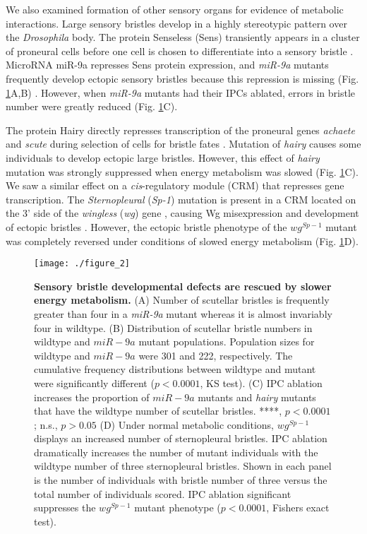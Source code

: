 We also examined formation of other sensory organs for evidence of metabolic interactions. Large sensory bristles develop in a highly stereotypic pattern over the \textit{Drosophila} body. The protein Senseless (Sens) transiently appears in a cluster of proneural cells before one cell is chosen to differentiate into a sensory bristle \cite{JafarNejad2003}. MicroRNA miR-9a represses Sens protein expression, and \textit{miR-9a} mutants frequently develop ectopic sensory bristles because this repression is missing (Fig. \ref{fig:metabolism:fig2}A,B) \cite{Cassidy2013,Li2006}. However, when \textit{miR-9a} mutants had their IPCs ablated, errors in bristle number were greatly reduced (Fig. \ref{fig:metabolism:fig2}C).

The protein Hairy directly represses transcription of the proneural genes \textit{achaete} and \textit{scute} during selection of cells for bristle fates \cite{VanDoren1994}. Mutation of \textit{hairy} causes some individuals to develop ectopic large bristles. However, this effect of \textit{hairy} mutation was strongly suppressed when energy metabolism was slowed (Fig. \ref{fig:metabolism:fig2}C). We saw a similar effect on a \textit{cis}-regulatory module (CRM) that represses gene transcription. The \textit{Sternopleural} (\textit{Sp-1}) mutation is present in a CRM located on the 3' side of the \textit{wingless} (\textit{wg}) gene \cite{Neumann1996a}, causing Wg misexpression and development of ectopic bristles \cite{Neumann1996a}. However, the ectopic bristle phenotype of the $wg^{Sp-1}$ mutant was completely reversed under conditions of slowed energy metabolism (Fig. \ref{fig:metabolism:fig2}D).

\begin{figure}[h!]
\centering
\texttt{[image: ./figure\_2]}
\caption[Sensory bristle developmental defects are rescued by slower energy metabolism.]{\textbf{Sensory bristle developmental defects are rescued by slower energy metabolism.} (A) Number of scutellar bristles is frequently greater than four in a \textit{miR-9a} mutant whereas it is almost invariably four in wildtype. (B) Distribution of scutellar bristle numbers in wildtype and $miR-9a$ mutant populations. Population sizes for wildtype and $miR-9a$ were 301 and 222, respectively. The cumulative frequency distributions between wildtype and mutant were significantly different ($p<0.0001$, KS test). (C) IPC ablation increases the proportion of $miR-9a$ mutants and \textit{hairy} mutants that have the wildtype number of scutellar bristles. ****, $p<0.0001$; n.s., $p>0.05$ (D) Under normal metabolic conditions, $wg^{Sp-1}$ displays an increased number of sternopleural bristles. IPC ablation dramatically increases the number of mutant individuals with the wildtype number of three sternopleural bristles. Shown in each panel is the number of individuals with bristle number of three versus the total number of individuals scored. IPC ablation significant suppresses the $wg^{Sp-1}$ mutant phenotype ($p<0.0001$, Fishers exact test).}
\label{fig:metabolism:fig2}
\end{figure}

